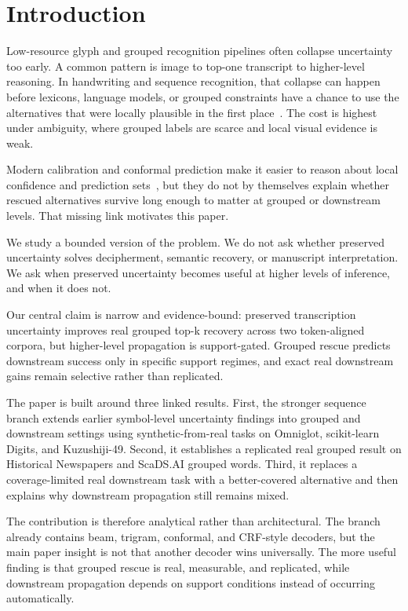\section{Introduction}

Low-resource glyph and grouped recognition pipelines often collapse uncertainty too early. A common pattern is image to top-one transcript to higher-level reasoning. In handwriting and sequence recognition, that collapse can happen before lexicons, language models, or grouped constraints have a chance to use the alternatives that were locally plausible in the first place~\cite{plamondon2000handwriting,graves2006ctc,scheidl2018wordbeam}. The cost is highest under ambiguity, where grouped labels are scarce and local visual evidence is weak.

Modern calibration and conformal prediction make it easier to reason about local confidence and prediction sets~\cite{guo2017calibration,angelopoulos2021conformal}, but they do not by themselves explain whether rescued alternatives survive long enough to matter at grouped or downstream levels. That missing link motivates this paper.

We study a bounded version of the problem. We do not ask whether preserved uncertainty solves decipherment, semantic recovery, or manuscript interpretation. We ask when preserved uncertainty becomes useful at higher levels of inference, and when it does not.

Our central claim is narrow and evidence-bound: preserved transcription uncertainty improves real grouped top-k recovery across two token-aligned corpora, but higher-level propagation is support-gated. Grouped rescue predicts downstream success only in specific support regimes, and exact real downstream gains remain selective rather than replicated.

The paper is built around three linked results. First, the stronger sequence branch extends earlier symbol-level uncertainty findings into grouped and downstream settings using synthetic-from-real tasks on Omniglot, scikit-learn Digits, and Kuzushiji-49. Second, it establishes a replicated real grouped result on Historical Newspapers and ScaDS.AI grouped words. Third, it replaces a coverage-limited real downstream task with a better-covered alternative and then explains why downstream propagation still remains mixed.

The contribution is therefore analytical rather than architectural. The branch already contains beam, trigram, conformal, and CRF-style decoders, but the main paper insight is not that another decoder wins universally. The more useful finding is that grouped rescue is real, measurable, and replicated, while downstream propagation depends on support conditions instead of occurring automatically.
